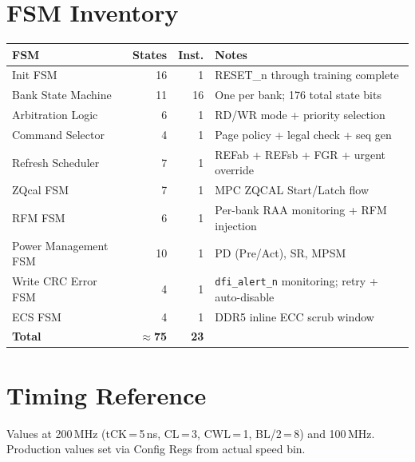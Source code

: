 \documentclass[10pt,a4paper]{article}
\newcommand{\Th}[1]{\cellcolor{thbg}\textbf{\small\color{acc1}#1}}
\newcommand{\RA}{\rowcolor{white}}
\newcommand{\RB}{\rowcolor{altbg}}
\begin{document}
\section{FSM Inventory}

\begin{center}
\begin{tabularx}{0.9\linewidth}{@{} l r r X @{}}
\toprule
\Th{FSM} & \Th{States} & \Th{Inst.} & \Th{Notes} \\
\midrule
\RA Init FSM              & 16 & 1  & RESET\_n through training complete \\
\RB Bank State Machine    & 11 & 16 & One per bank; 176 total state bits \\
\RA Arbitration Logic     & 6  & 1  & RD/WR mode + priority selection \\
\RB Command Selector      & 4  & 1  & Page policy + legal check + seq gen \\
\RA Refresh Scheduler     & 7  & 1  & REFab + REFsb + FGR + urgent override \\
\RB ZQcal FSM             & 7  & 1  & MPC ZQCAL Start/Latch flow \\
\RA RFM FSM               & 6  & 1  & Per-bank RAA monitoring + RFM injection \\
\RB Power Management FSM  & 10 & 1  & PD (Pre/Act), SR, MPSM \\
\RA Write CRC Error FSM   & 4  & 1  & \texttt{dfi\_alert\_n} monitoring; retry + auto-disable \\
\RB ECS FSM               & 4  & 1  & DDR5 inline ECC scrub window \\
\midrule
\RA \textbf{Total}        & \textbf{$\approx$75} & \textbf{23} & \\
\bottomrule
\end{tabularx}
\end{center}

\section{Timing Reference}

Values at 200\,MHz (tCK\,=\,5\,ns, CL\,=\,3, CWL\,=\,1, BL/2\,=\,8) and 100\,MHz.
Production values set via Config Regs from actual speed bin.
\end{document}
